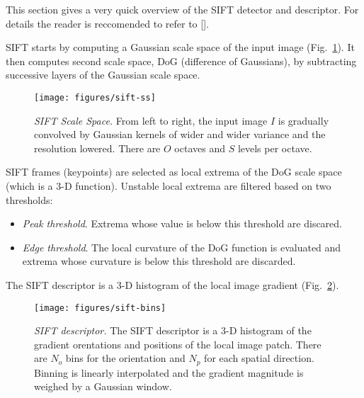 \documentclass{article}
\begin{document}
This section gives a very quick overview of the SIFT detector and
descriptor. For details the reader is reccomended to refer to [].

 SIFT starts by computing a
Gaussian scale space of the input image (Fig.~\ref{fig:sift-ss}). It
then computes second scale space, DoG (difference of Gaussians), by
subtracting successive layers of the Gaussian scale space.

\begin{figure}
\begin{center}
\texttt{[image: figures/sift-ss]}
\end{center}
\caption{{\em SIFT Scale Space.} From left to right, the input image
  $I$ is gradually convolved by Gaussian kernels of wider and wider
  variance and the resolution lowered. There are $O$ octaves and $S$
  levels per octave.}\label{fig:sift-ss}
\end{figure}

 SIFT frames (keypoints) are selected as
local extrema of the DoG scale space (which is a 3-D
function). Unstable local extrema are filtered based on two
thresholds:
\begin{itemize}
\item {\em Peak threshold}. Extrema whose value is below this
  threshold are discared.
\item {\em Edge threshold}. The local curvature of the DoG function is
  evaluated and extrema whose curvature is below this threshold are
  discarded.
\end{itemize}

 The SIFT descriptor is a 3-D histogram of
the local image gradient (Fig.~\ref{fig:sift-bins}).

\begin{figure}
\begin{center}
\texttt{[image: figures/sift-bins]}
\end{center}
\caption{{\em SIFT descriptor.} The SIFT descriptor is a 3-D histogram
  of the gradient orentations and positions of the local image
  patch. There are $N_o$ bins for the orientation and $N_p$ for each
  spatial direction. Binning is linearly interpolated and the gradient
  magnitude is weighed by a Gaussian window.}\label{fig:sift-bins}
\end{figure}

\end{document}
